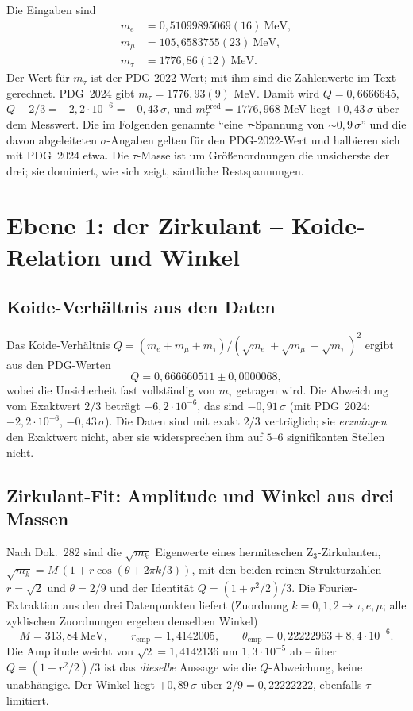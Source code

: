 Die Eingaben sind
\begin{align}
  m_e    &= 0{,}51099895069(16)\ \text{MeV},\\
  m_\mu  &= 105{,}6583755(23)\ \text{MeV},\\
  m_\tau &= 1776{,}86(12)\ \text{MeV}.
\end{align}
Der Wert für $m_\tau$ ist der PDG-2022-Wert; mit ihm sind die Zahlenwerte im
Text gerechnet. PDG~2024 gibt $m_\tau=1776{,}93(9)$ MeV. Damit wird
$Q=0{,}6666645$, $Q-2/3=-2{,}2\cdot10^{-6}=-0{,}43\,\sigma$, und
$m_\tau^{\text{pred}}=1776{,}968$ MeV liegt $+0{,}43\,\sigma$ über dem Messwert.
Die im Folgenden genannte \enquote{eine $\tau$-Spannung von $\sim0{,}9\,\sigma$}
und die davon abgeleiteten $\sigma$-Angaben gelten für den PDG-2022-Wert und
halbieren sich mit PDG~2024 etwa.
Die $\tau$-Masse ist um Größenordnungen die unsicherste der drei; sie
dominiert, wie sich zeigt, sämtliche Restspannungen.

\section{Ebene 1: der Zirkulant -- Koide-Relation und Winkel}

\subsection{Koide-Verhältnis aus den Daten}
Das Koide-Verhältnis $Q=(m_e+m_\mu+m_\tau)/(\sqrt{m_e}+\sqrt{m_\mu}+\sqrt{m_\tau})^2$
ergibt aus den PDG-Werten
\begin{equation}
  Q = 0{,}666660511 \pm 0{,}0000068,
\end{equation}
wobei die Unsicherheit fast vollständig von $m_\tau$ getragen wird. Die
Abweichung vom Exaktwert $2/3$ beträgt $-6{,}2\cdot10^{-6}$, das sind
$-0{,}91\,\sigma$ (mit PDG~2024: $-2{,}2\cdot10^{-6}$, $-0{,}43\,\sigma$). Die Daten sind mit exakt $2/3$ verträglich; sie
\emph{erzwingen} den Exaktwert nicht, aber sie widersprechen ihm auf
$5$--$6$ signifikanten Stellen nicht.

\subsection{Zirkulant-Fit: Amplitude und Winkel aus drei Massen}
Nach Dok.~282 sind die $\sqrt{m_k}$ Eigenwerte eines hermiteschen
Z$_3$-Zirkulanten, $\sqrt{m_k}=M\,(1+r\cos(\theta+2\pi k/3))$, mit den beiden
reinen Strukturzahlen $r=\sqrt2$ und $\theta=2/9$ und der Identität
$Q=(1+r^2/2)/3$. Die Fourier-Extraktion aus den drei Datenpunkten liefert
(Zuordnung $k=0,1,2\to\tau,e,\mu$; alle zyklischen Zuordnungen ergeben
denselben Winkel)
\begin{equation}
  M = 313{,}84\ \text{MeV},\qquad
  r_{\text{emp}} = 1{,}4142005,\qquad
  \theta_{\text{emp}} = 0{,}22222963 \pm 8{,}4\cdot10^{-6}.
\end{equation}
Die Amplitude weicht von $\sqrt2=1{,}4142136$ um $1{,}3\cdot10^{-5}$ ab --
über $Q=(1+r^2/2)/3$ ist das \emph{dieselbe} Aussage wie die
$Q$-Abweichung, keine unabhängige. Der Winkel liegt $+0{,}89\,\sigma$ über
$2/9=0{,}22222222$, ebenfalls $\tau$-limitiert.

